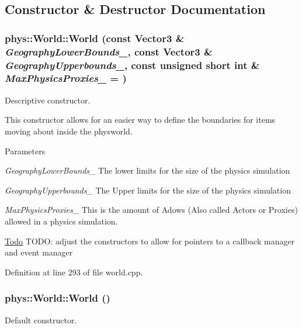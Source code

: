 \subsection{Constructor \& Destructor Documentation}
\hypertarget{classphys_1_1World_aa74e4e6053044c3ecec87fdbf7880c18}{
\subsubsection[{World}]{\setlength{\rightskip}{0pt plus 5cm}phys::World::World (const {\bf Vector3} \& {\em GeographyLowerBounds\_\-}, \/  const {\bf Vector3} \& {\em GeographyUpperbounds\_\-}, \/  const unsigned short int \& {\em MaxPhysicsProxies\_\-} = {})}}
\label{da/ddf/classphys_1_1World_aa74e4e6053044c3ecec87fdbf7880c18}


Descriptive constructor. 

This constructor allows for an easier way to define the boundaries for items moving about inside the physworld. 
\begin{DoxyParams}{Parameters}
\item[{\em GeographyLowerBounds\_\-}]The lower limits for the size of the physics simulation \item[{\em GeographyUpperbounds\_\-}]The Upper limits for the size of the physics simulation \item[{\em MaxPhysicsProxies\_\-}]This is the amount of Adows (Also called Actors or Proxies) allowed in a physics simulation.\end{DoxyParams}
\begin{Desc}
\item[\hyperlink{todo__todo000017}{Todo}]TODO: adjust the constructors to allow for pointers to a callback manager and event manager \end{Desc}


Definition at line 293 of file world.cpp.

\hypertarget{classphys_1_1World_a7f762724406c874250c3dc8910a1e695}{
\subsubsection[{World}]{\setlength{\rightskip}{0pt plus 5cm}phys::World::World ()}}
\label{da/ddf/classphys_1_1World_a7f762724406c874250c3dc8910a1e695}


Default constructor. 

